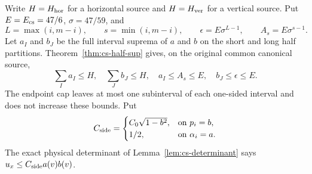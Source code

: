 Write $H=H_{\rm hor}$ for a horizontal source and
$H=H_{\rm ver}$ for a vertical source. Put $E=E_{\rm cs}=47/6$,
$\sigma=47/59$, and
\[
 L=\max(i,m-i),\qquad s=\min(i,m-i),\qquad
 \epsilon=E\sigma^{L-1},\qquad A_s=E\sigma^{s-1}.
\]
Let $a_I$ and $b_J$ be the full interval suprema of $a$ and $b$
on the short and long half partitions. Theorem~\ref{thm:cs-half-sup}
gives, on the original common canonical source,
\begin{equation}\label{eq:iso-halves}
 \sum_Ia_I\le H,\quad \sum_Jb_J\le H,\quad
 a_I\le A_s\le E,\quad b_J\le\epsilon\le E.
\end{equation}
The endpoint cap leaves at most one subinterval of each one-sided
interval and does not increase these bounds. Put
\[
 C_{\rm side}=
 \begin{cases}
 C_0\sqrt{1-b^2},&\text{on }p_i=b,\\
 1/2,&\text{on }\alpha_i=a.
 \end{cases}
\]
The exact physical determinant of Lemma~\ref{lem:cs-determinant}
says $u_x\le C_{\rm side}a(v)b(v)$.

